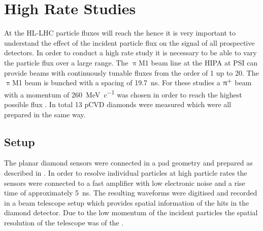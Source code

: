 \section{High Rate Studies}
At the \ac{HL-LHC} particle fluxes will reach the  hence it is very important to understand the effect of the incident particle flux on the signal of all prospective detectors. In order to conduct a high rate study it is necessary to be able to vary the particle flux over a large range. The $\uppi$M1 beam line at the \ac{HIPA} at \ac{PSI} \cite{hipa} can provide beams with continuously tunable fluxes from the order of \SI{1}{\khzcm} up to \SI{20}{\mhzcm}. The $\uppi$M1 beam is bunched with a spacing of \SI{19.7}{\nano\second}. For these studies a $\uppi^{\text{+}}$ beam with a momentum of \SI{260}{\mega\electronvolt\per c}  was chosen in order to reach the highest possible flux \cite{pim1}. In total 13 \ac{pCVD} diamonds were measured which were all prepared in the same way.\par
\subsection{Setup}
The planar diamond sensors were connected in a pad geometry and prepared as described in \cite{felix}. 
In order to resolve individual particles at high particle rates the sensors were connected to a fast amplifier with low electronic noise and a rise time of approximately \SI{5}{\nano\second}. The resulting waveforms were digitised and recorded in a beam telescope setup \cite{felix} which provides spatial information of the hits in the diamond detector. Due to the low momentum of the incident particles the spatial resolution of the telescope was of the .\par
